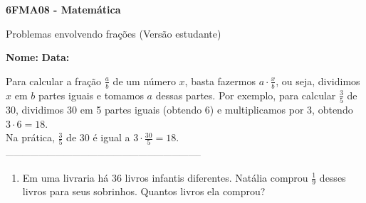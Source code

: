 \documentclass[a4paper,14pt]{article}
\begin{document}
	
	\noindent\textbf{6FMA08 - Matemática} 
	
	\begin{center}Problemas envolvendo frações (Versão estudante)
	\end{center}
	
	\noindent\textbf{Nome:} \underline{\hspace{10cm}}
	\noindent\textbf{Data:} \underline{\hspace{4cm}}
	
	
	\begin{multicols}{2}
		\noindent Para calcular a fração $\frac{a}{b}$ de um número $x$, basta fazermos $a \cdot \frac{x}{b}$, ou seja, dividimos $x$ em $b$ partes iguais e tomamos $a$ dessas partes. Por exemplo, para calcular $\frac{3}{5}$ de 30, dividimos 30 em 5 partes iguais (obtendo 6) e multiplicamos por 3, obtendo $3 \cdot 6 = 18$. \\
		Na prática, $\frac{3}{5}$ de 30 é igual a $3 \cdot \frac{30}{5} = 18$. \\
		\noindent\textsubscript{-----------------------------------------------------------------------}
		\begin{enumerate} 
			\item Em uma livraria há 36 livros infantis diferentes. Natália comprou $\frac{1}{9}$ desses livros para seus sobrinhos. Quantos livros ela comprou? \\\\\\\\\\\\\\\\\\\\\\\\\\\\\\\\

\end{enumerate}
\end{multicols}
\end{document}
